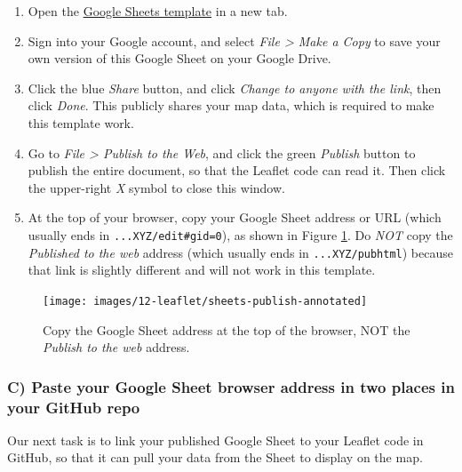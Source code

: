 \documentclass[
  english,
]{book}
\begin{document}
\begin{enumerate}
\def\labelenumi{\arabic{enumi}.}
\item
  Open the \href{https://docs.google.com/spreadsheets/d/1ZxvU8eGyuN9M8GxTU9acKVJv70iC3px_m3EVFsOHN9g}{Google Sheets template} in a new tab.
\item
  Sign into your Google account, and select \emph{File \textgreater{} Make a Copy} to save your own version of this Google Sheet on your Google Drive.
\item
  Click the blue \emph{Share} button, and click \emph{Change to anyone with the link}, then click \emph{Done}. This publicly shares your map data, which is required to make this template work.
\item
  Go to \emph{File \textgreater{} Publish to the Web}, and click the green \emph{Publish} button to publish the entire document, so that the Leaflet code can read it. Then click the upper-right \emph{X} symbol to close this window.
\item
  At the top of your browser, copy your Google Sheet address or URL (which usually ends in \texttt{...XYZ/edit\#gid=0}), as shown in Figure \ref{fig:sheets-publish}. Do \emph{NOT} copy the \emph{Published to the web} address (which usually ends in \texttt{...XYZ/pubhtml}) because that link is slightly different and will not work in this template.
\end{enumerate}



\begin{figure}
\texttt{[image: images/12-leaflet/sheets-publish-annotated]} \caption{Copy the Google Sheet address at the top of the browser, NOT the \emph{Publish to the web} address.}\label{fig:sheets-publish}
\end{figure}

\hypertarget{c-paste-your-google-sheet-browser-address-in-two-places-in-your-github-repo}{%
\subsubsection*{C) Paste your Google Sheet browser address in two places in your GitHub repo}\label{c-paste-your-google-sheet-browser-address-in-two-places-in-your-github-repo}}

Our next task is to link your published Google Sheet to your Leaflet code in GitHub, so that it can pull your data from the Sheet to display on the map.
\end{document}
